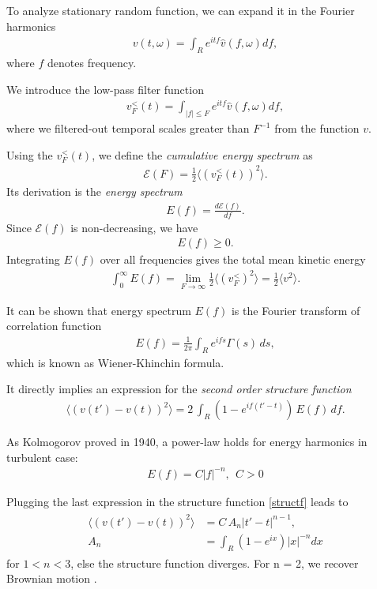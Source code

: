 To analyze stationary random function, we can expand it in the Fourier harmonics
\begin{align}
v(t,\omega) = \int_{R} e^{itf} \hat{v}(f,\omega) df,
\end{align}
where $f$ denotes frequency.

We introduce the low-pass filter function
\begin{align}
v_F^{<}(t) = \int_{|f| \leq F} e^{itf} \hat{v}(f,\omega) df,
\end{align} 
where we filtered-out temporal scales greater than $F^{-1}$ from the function $v$.

Using the $v_F^{<}(t)$, we define the \textit{cumulative energy spectrum} as
\begin{align*}
\mathcal{E}(F) = \frac{1}{2} \langle (v_F^{<}(t))^2 \rangle.
\end{align*}
Its derivation is the \textit{energy spectrum}
\begin{align*}
E(f) = \frac{d\mathcal{E}(f)}{df}.
\end{align*}
Since $\mathcal{E}(f)$ is non-decreasing, we have
\begin{align*}
E(f) \geq 0.
\end{align*}
Integrating  $E(f)$ over all frequencies gives the total mean kinetic energy
\begin{align}
\int_0^{\infty} E(f) = \lim_{F \to \infty} \frac{1}{2} \langle (v_F^{<})^2 \rangle = \frac{1}{2} \langle v^2 \rangle.
\end{align}

It can be shown that energy spectrum $E(f)$ is the Fourier transform of correlation function
\begin{align*} 
E(f)  = \frac{1}{2 \pi} \int_{R} e^{ifs} \Gamma(s) \,ds,
\end{align*}
which is known as Wiener-Khinchin formula.

It directly implies an expression for the \textit{second order structure function}
\begin{align}\label{structf}
\langle (v(t') - v(t))^2 \rangle = 2 \, \int_{R} (1 - e^{if(t' - t)}) \, E(f) \, df.
\end{align}

As Kolmogorov proved in 1940, a power-law holds for energy harmonics in turbulent case:
\begin{align}
E(f) = C |f|^{-n}, ~~ C>0
\end{align}

Plugging the last expression in the structure function \ref{structf} leads to
\begin{align} \label{Brown}
\begin{split}
\langle (v(t') - v(t))^2 \rangle &= C\,A_n |t' - t|^{n-1}, \\
A_n &= \int_R (1-e^{ix}) |x|^{-n} dx
\end{split}
\end{align}
for $1 < n < 3$, else the structure function diverges. For n = 2, we recover Brownian motion \cite{turb}.